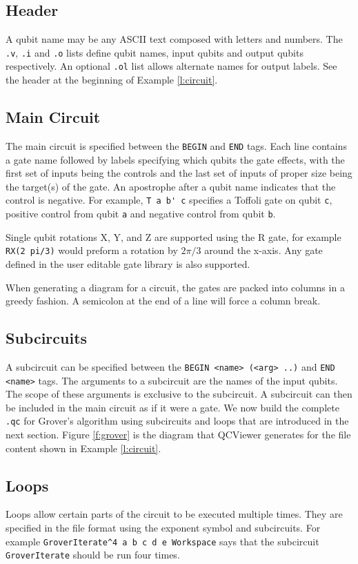 \documentclass[aps,prl,reprint,floatfix,superscriptaddress]{revtex4-1} %
\begin{document}
\subsection{Header}
A qubit name may be any ASCII text composed with letters and numbers. 
The \verb+.v+, \verb+.i+ and \verb+.o+ lists define qubit names, input qubits and output qubits respectively.
An optional \verb+.ol+ list allows alternate names for output labels.
See the header at the beginning of Example \ref{l:circuit}.

\subsection{Main Circuit}
The main circuit is specified between the \verb+BEGIN+ and \verb+END+ tags.
Each line contains a gate name followed by labels specifying which qubits the gate effects, with the first set of inputs being the controls and the last set of inputs of proper size being the target(s) of the gate.
An apostrophe after a qubit name indicates that the control is negative. 
For example, \verb+T a b' c+ specifies a Toffoli gate on qubit \verb+c+, positive control from qubit \verb+a+ and negative control from qubit \verb+b+. 

Single qubit rotations X, Y, and Z are supported using the R gate, for example \verb+RX(2 pi/3)+ would preform a rotation by $2\pi/3$ around the x-axis. 
Any gate defined in the user editable gate library is also supported.

When generating a diagram for a circuit, the gates are packed into columns in a greedy fashion. 
A semicolon at the end of a line will force a column break.

\subsection{Subcircuits}
A subcircuit can be specified between the \verb+BEGIN <name> (<arg> ..)+ and \verb+END <name>+ tags.
The arguments to a subcircuit are the names of the input qubits.
The scope of these arguments is exclusive to the subcircuit.
A subcircuit can then be included in the main circuit as if it were a gate.
We now build the complete \verb+.qc+ for Grover's algorithm using subcircuits and loops that are introduced in the next section.
Figure \ref{f:grover} is the diagram that QCViewer generates for the file content shown in Example \ref{l:circuit}.

\subsection{Loops}
Loops allow certain parts of the circuit to be executed multiple times. 
They are specified in the file format using the exponent symbol and subcircuits.
For example \verb+GroverIterate^4 a b c d e Workspace+ says that the subcircuit \verb+GroverIterate+ should be run four times.
\end{document}
